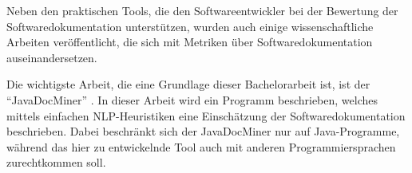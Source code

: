 Neben den praktischen Tools, die den Softwareentwickler bei der Bewertung der Softwaredokumentation unterstützen, wurden auch einige wissenschaftliche Arbeiten veröffentlicht, die sich mit Metriken über Softwaredokumentation auseinandersetzen. 

Die wichtigste Arbeit, die eine Grundlage dieser Bachelorarbeit ist, ist der \enquote{JavaDocMiner} \cite[S. 68-79]{AutomaticQualityAssessmentofSourceCodeComments:TheJavadocMiner}. In dieser Arbeit wird ein Programm beschrieben, welches mittels einfachen \ac{NLP}-Heuristiken eine Einschätzung der Softwaredokumentation beschrieben. Dabei beschränkt sich der JavaDocMiner nur auf Java-Programme, während das hier zu entwickelnde Tool  auch mit anderen Programmiersprachen zurechtkommen soll. 
